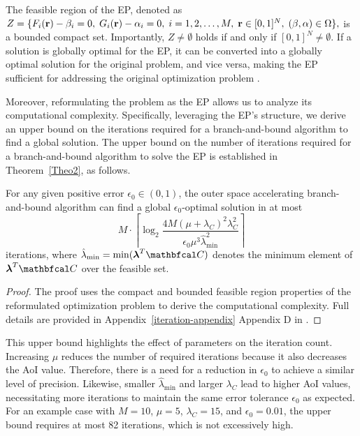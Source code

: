 The feasible region of the EP, denoted as $
Z = \{ F_i(\mathbf{r}) - \beta_i = 0, \; G_i(\mathbf{r}) - \alpha_i = 0, \; i = 1, 2, \dots, M, \; \mathbf{r} \in [0,1]^N, \; (\beta, \alpha) \in \Omega \},
$
is a bounded compact set. Importantly, \( Z \neq \emptyset \) holds if and only if \( [0,1]^N \neq \emptyset \).
%
If a solution is globally optimal for the EP, it can be converted into a globally optimal solution for the original problem, and vice versa, making the EP sufficient for addressing the original optimization problem \cite{JIAO2022112701}.

Moreover, reformulating the problem as the EP allows us to analyze its computational complexity. Specifically, leveraging the EP's structure, we derive an upper bound on the iterations required for a branch-and-bound algorithm to find a global solution. The upper bound on the number of iterations required for a branch-and-bound algorithm to solve the EP is established in Theorem~\ref{Theo2}, as follows.


\begin{Theorem}\label{Theo2}
For any given positive error \( \epsilon_0 \in (0, 1) \), the outer space accelerating branch-and-bound algorithm can find a global \( \epsilon_0 \)-optimal solution in at most 
\begin{equation}
M \cdot \left\lceil \log_2 \frac{4M (\mu+\lambda_C)^2\lambda_C^2}{\epsilon_0\mu^3\hat{\lambda}_{\min}^{2}} \right\rceil
\end{equation}
iterations, where \( \hat{\lambda}_{\min} = \min(\boldsymbol{\lambda}^T \bfc) \) denotes the minimum element of \( \boldsymbol{\lambda}^T \bfc \) over the feasible set.
\end{Theorem}

\begin{proof} 
The proof uses the compact and bounded feasible region properties of the reformulated optimization problem to derive the computational complexity. Full details are provided in 
{Appendix~\ref{iteration-appendix}}
{Appendix D in \cite{technicalNote}}.
\end{proof}

This upper bound highlights the effect of parameters on the iteration count. Increasing $\mu$ reduces the number of required iterations because it also decreases the AoI value. Therefore, there is a need for a reduction in $\epsilon_0$ to achieve a similar level of precision. Likewise, smaller $\hat{\lambda}_{\min}$ and larger $\lambda_C$ lead to higher AoI values, necessitating more iterations to maintain the same error tolerance $\epsilon_0$ as expected. For an example case with $M = 10$, $\mu = 5$, $\lambda_C = 15$, and $\epsilon_0 = 0.01$, the upper bound requires at most 82 iterations, which is not excessively high. %


